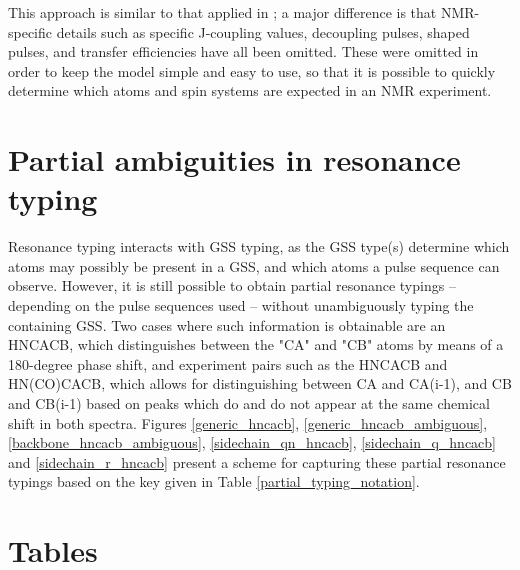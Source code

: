 This approach is similar to that applied in \cite{fox2004delineation}; a major
difference is that NMR-specific details such as specific J-coupling values, 
decoupling pulses, shaped pulses, and transfer efficiencies have all been 
omitted.  These were omitted in order to keep the model simple and easy to use,
so that it is possible to quickly determine which atoms and spin systems are 
expected in an NMR experiment.


\section{Partial ambiguities in resonance typing}
Resonance typing interacts with GSS typing, as the GSS type(s) determine
which atoms may possibly be present in a GSS, and which atoms a pulse 
sequence can observe.  However, it is still possible to obtain partial 
resonance typings -- depending on the pulse sequences used -- without
unambiguously typing the containing GSS.  Two cases where such information
is obtainable are an HNCACB, which distinguishes between the "CA" and "CB"
atoms by means of a 180-degree phase shift, and experiment pairs such as the
HNCACB and HN(CO)CACB, which allows for distinguishing between CA and CA(i-1),
and CB and CB(i-1) based on peaks which do and do not appear at the same 
chemical shift in both spectra.
Figures 
\ref{generic_hncacb},
\ref{generic_hncacb_ambiguous},
\ref{backbone_hncacb_ambiguous},
\ref{sidechain_qn_hncacb},
\ref{sidechain_q_hncacb} and
\ref{sidechain_r_hncacb}
present a scheme for capturing these partial resonance typings based on the
key given in Table \ref{partial_typing_notation}.


\clearpage
\section{Tables}

